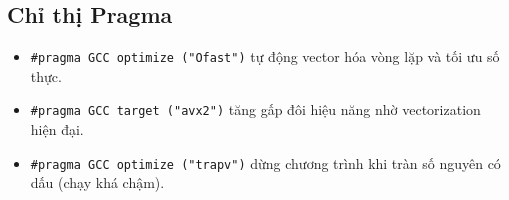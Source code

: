 	\subsection{Chỉ thị Pragma}
		\begin{itemize}
			\item \lstinline{#pragma GCC optimize ("Ofast")} tự động vector hóa vòng lặp và tối ưu số thực.
			\item \lstinline{#pragma GCC target ("avx2")} tăng gấp đôi hiệu năng nhờ vectorization hiện đại.
			\item \lstinline{#pragma GCC optimize ("trapv")} dừng chương trình khi tràn số nguyên có dấu (chạy khá chậm).
		\end{itemize}
